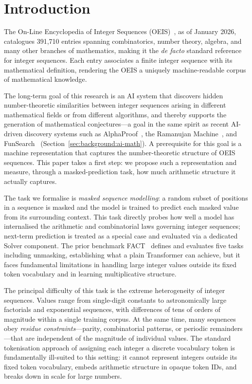 
\section{Introduction}
\label{sec:introduction}

The On-Line Encyclopedia of Integer Sequences (OEIS)~\cite{sloane1996}, as of January 2026,
catalogues 391,710 entries spanning combinatorics, number theory, algebra, and many
other branches of mathematics, making it the \emph{de facto} standard reference for integer
sequences. Each entry associates a finite integer sequence with its mathematical definition,
rendering the OEIS a uniquely machine-readable corpus of mathematical knowledge.

The long-term goal of this research is an AI system that discovers hidden number-theoretic
similarities between integer sequences arising in different mathematical fields or from
different algorithms, and thereby supports the generation of mathematical conjectures---a
goal in the same spirit as recent AI-driven discovery systems such as
AlphaProof~\cite{alphaproof2024}, the Ramanujan Machine~\cite{raayoni2021ramanujan}, and
FunSearch~\cite{romera2023funsearch} (Section~\ref{sec:background:ai-math}). A prerequisite
for this goal is a machine representation that captures the number-theoretic structure of
OEIS sequences. This paper takes a first step: we propose such a representation and measure,
through a masked-prediction task, how much arithmetic structure it actually captures.

The task we formalise is \emph{masked sequence modelling}: a random subset of positions in a
sequence is masked and the model is trained to predict each masked value from its surrounding
context. This task directly probes how well a model has internalised the arithmetic and
combinatorial laws governing integer sequences; next-term prediction is treated as a special
case and evaluated via a dedicated Solver component. The prior benchmark FACT~\cite{zurich-fact}
defines and evaluates five tasks including unmasking, establishing what a plain Transformer can
achieve, but it faces fundamental limitations in handling large integer values outside its fixed
token vocabulary and in learning multiplicative structure.

The principal difficulty of this task is the extreme heterogeneity of integer sequences.
Values range from single-digit constants to astronomically large factorials and exponential
sequences, with differences of tens of orders of magnitude within a single training corpus.
At the same time, many sequences obey \emph{residue constraints}---parity, combinatorial
patterns, or periodic remainders---that are independent of the magnitude of individual values.
The standard tokenisation approach of assigning each integer a discrete vocabulary token is
fundamentally ill-suited to this setting: it cannot represent integers outside its fixed token
vocabulary, embeds arithmetic structure in opaque token IDs, and breaks down in scale for large numbers.

